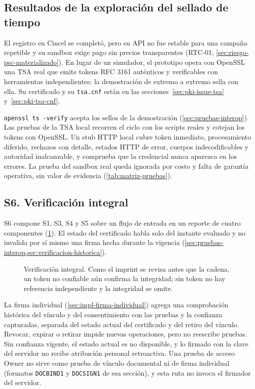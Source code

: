 \subsection{Resultados de la exploración del sellado de tiempo}\label{sec:impl-spike-tsa}

El registro en Cincel se completó, pero su API no fue estable para una campaña repetible y su sandbox exige pago sin precios transparentes (RTC-01, \cref{sec:riesgo-psc-materializado}). En lugar de un simulador, el prototipo opera con OpenSSL una TSA real que emite tokens RFC 3161 auténticos y verificables con herramientas independientes; la demostración de extremo a extremo sella con ella. Su certificado y su \texttt{tsa.cnf} están en las secciones~\ref{sec:pki-issue-tsa} y~\ref{sec:pki-tsa-cnf}.

\texttt{openssl ts -verify} acepta los sellos de la demostración (\cref{sec:pruebas-interop}). Las pruebas de la TSA local recorren el ciclo con los scripts reales y cotejan los tokens con OpenSSL. Un stub HTTP local cubre token inmediato, procesamiento diferido, rechazos con detalle, estados HTTP de error, cuerpos indecodificables y autoridad inalcanzable, y comprueba que la credencial nunca aparezca en los errores. La prueba del sandbox real queda ignorada por costo y falta de garantía operativa, sin valor de evidencia (\cref{tab:matriz-pruebas}).

\subsection{S6. Verificación integral}\label{sec:impl-s6-verificacion}

S6 compone S1, S3, S4 y S5 sobre un flujo de entrada en un reporte de cuatro componentes (\cref{fig:impl-verificacion}). El estado del certificado habla solo del instante evaluado y no invalida por sí mismo una firma hecha durante la vigencia (\cref{sec:pruebas-interop,sec:verificacion-historica}).

\begin{figure}[!tb]
  \centering
  
  \caption{Verificación integral. Como el imprint se revisa antes que la cadena, un token no confiable aún confirma la integridad; sin token no hay referencia independiente y la integridad se omite.}
  \label{fig:impl-verificacion}
\end{figure}

La firma individual (\cref{sec:impl-firma-individual}) agrega una comprobación histórica del vínculo y del consentimiento con las pruebas y la confianza capturadas, separada del estado actual del certificado y del retiro del vínculo. Revocar, expirar o retirar impide nuevas operaciones, pero no reescribe pruebas. Sin confianza vigente, el estado actual es no disponible, y lo firmado con la clave del servidor no recibe atribución personal retroactiva. Una prueba de acceso Owner no sirve como prueba de vínculo documental ni de firma individual (formatos \texttt{DOCBIND1} y \texttt{DOCSIGN1} de esa sección), y esta ruta no invoca el firmador del servidor.

